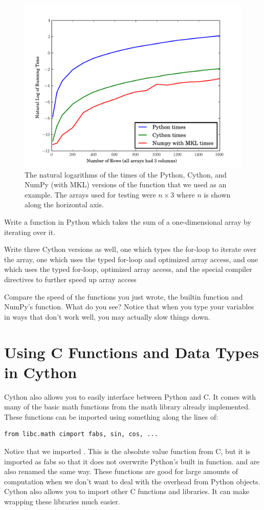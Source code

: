 \begin{figure}
\includegraphics[width=\textwidth]{rowdot.pdf}
\caption{
The natural logarithms of the times of the Python, Cython, and NumPy (with MKL) versions of the  function that we used as an example.
The arrays used for testing were $n\times 3$ where $n$ is shown along the horizontal axis.
}
\label{cython:rowdot}
\end{figure}

\begin{problem}
Write a function in Python which takes the sum of a one-dimensional array by iterating over it.

Write three Cython versions as well, one which types the for-loop to iterate over the array, one which uses the typed for-loop and optimized array access, and one which uses the typed for-loop, optimized array access, and the special compiler directives to further speed up array access

Compare the speed of the functions you just wrote, the builtin  function and NumPy's  function.
What do you see?
Notice that when you type your variables in ways that don't work well, you may actually slow things down.
\end{problem}

\section*{Using C Functions and Data Types in Cython}
Cython also allows you to easily interface between Python and C.
It comes with many of the basic math functions from the math library already implemented.
These functions can be imported using something along the lines of:
\begin{lstlisting}
from libc.math cimport fabs, sin, cos, ...
\end{lstlisting}
Notice that we imported .
This is the absolute value function from C, but it is imported as fabs so that it does not overwrite Python's built in  function. 
 and  are also renamed the same way.
These functions are good for large amounts of computation when we don't want to deal with the overhead from Python objects.
Cython also allows you to import other C functions and libraries.
It can make wrapping these libraries much easier.

